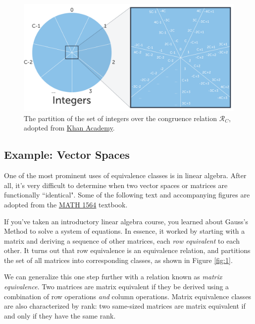\documentclass{article}
\begin{document}
        \begin{figure}[htbp]
            \centering
            \captionsetup{width=.8\linewidth}
            \includegraphics[scale = .4]{sp23/hw-supplements/hw5-supp/images/congruence_classes.png}
            \caption{The partition of the set of integers over the congruence relation $\mathcal{R}_{C}$, adopted from \href{https://www.khanacademy.org/computing/computer-science/cryptography/modarithmetic/a/congruence-modulo}{Khan Academy}.}
            \label{fig:congruency_classes}
        \end{figure}
        
    \subsection*{Example: Vector Spaces}
        One of the most prominent uses of equivalence classes is in linear algebra. After all, it's very difficult to determine when two vector spaces or matrices are functionally ``identical". Some of the following text and accompanying figures are adopted from the \href{https://hefferon.net/linearalgebra/}{MATH 1564} textbook.

        \vspace{3mm}
        If you've taken an introductory linear algebra course, you learned about Gauss's Method to solve a system of equations. In essence, it worked by starting with a matrix and deriving a sequence of other matrices, each \textit{row equivalent} to each other. It turns out that row equivalence is an equivalence relation, and partitions the set of all matrices into corresponding classes, as shown in Figure \ref*{fig:1}.

        \vspace{3mm}
        We can generalize this one step further with a relation known as \textit{matrix equivalence}. Two matrices are matrix equivalent if they be derived using a combination of row operations \textit{and} column operations. Matrix equivalence classes are also characterized by rank: two same-sized matrices are matrix equivalent if and only if they have the same rank.
        
\end{document}
